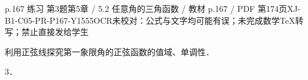 \begin{bankitem}{p.167 练习 第3题}{第5章 / 5.2 任意角的三角函数 / 教材 p.167 / PDF 第174页}{XJ-B1-C05-PR-P167-Y1555}{OCR未校对：公式与文字均可能有误；未完成数学TeX转写；禁止直接发给学生}
\begin{ocrdraft}
\par
利用正弦线探究第一象限角的正弦函数的值域、单调性．
\par
3．
\end{ocrdraft}
\end{bankitem}
